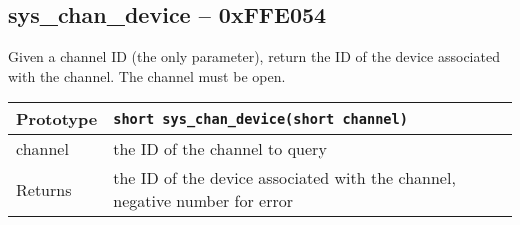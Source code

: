 \subsection*{sys\_chan\_device -- 0xFFE054}
Given a channel ID (the only parameter), return the ID of the device associated with the channel. The channel must be open.

\bigskip

\begin{tabular}{|l||l|} \hline
Prototype & \lstinline!short sys_chan_device(short channel)! \\ \hline
channel & the ID of the channel to query \\ \hline
Returns & the ID of the device associated with the channel, negative number for error \\ \hline
\end{tabular}

